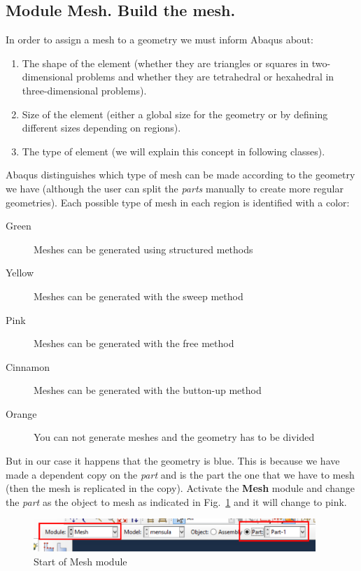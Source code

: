 \newpage
\subsection{Module Mesh. Build the mesh.}
In order to assign a mesh to a geometry we must inform Abaqus about:
\begin{enumerate}
\item The shape of the element (whether they are triangles or squares
  in two-dimensional problems and whether they are tetrahedral or
  hexahedral in three-dimensional problems).
\item Size of the element (either a global size for the geometry or
  by defining different sizes depending on regions).
\item The type of element (we will explain this concept in following
  classes).
\end{enumerate}

Abaqus distinguishes which type of mesh can be made according to the
geometry we have (although the user can split the \textit{parts}
manually to create more regular geometries). Each possible type of
mesh in each region is identified with a color:

\begin{description}
\item[Green] Meshes can be generated using structured methods
\item[Yellow] Meshes can be generated with the sweep method
\item[Pink] Meshes can be generated with the free method
\item[Cinnamon]Meshes can be generated with the button-up method
\item[Orange] You can not generate meshes and the geometry has to be
  divided
\end{description}

But in our case it happens that the geometry is blue. This is because we
have made a dependent copy on the \textit{part} and is the part the
one that we have to mesh (then the mesh is replicated in the
copy). Activate the \textbf{Mesh} module and change the \textit{part}
as the object to mesh as indicated in Fig.~\ref{figu51} and it will
change to pink.
\begin{figure}[!h]
  \centering
  \includegraphics[width=0.95\textwidth]{./body/images/imagen51.pdf}
  \caption{Start of Mesh module}
  \label{figu51}
\end{figure}

